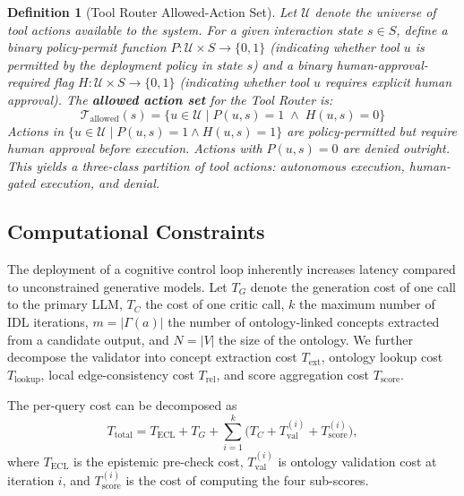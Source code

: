 \documentclass[11pt,a4paper]{article}
\newtheorem{definition}{Definition}
\begin{document}
\begin{definition}[Tool Router Allowed-Action Set]
\label{def:tool_router}
Let $\mathcal{U}$ denote the universe of tool actions available to the system. For a given interaction state $s \in S$, define a binary policy-permit function $P: \mathcal{U} \times S \to \{0,1\}$ (indicating whether tool $u$ is permitted by the deployment policy in state $s$) and a binary human-approval-required flag $H: \mathcal{U} \times S \to \{0,1\}$ (indicating whether tool $u$ requires explicit human approval). The \textbf{allowed action set} for the Tool Router is:
\begin{equation}
  \mathcal{T}_{\text{allowed}}(s) = \{u \in \mathcal{U} \mid P(u,s) = 1 \;\wedge\; H(u,s) = 0\}
  \label{eq:tool_router}
\end{equation}
Actions in $\{u \in \mathcal{U} \mid P(u,s) = 1 \wedge H(u,s) = 1\}$ are policy-permitted but require human approval before execution. Actions with $P(u,s) = 0$ are denied outright. This yields a three-class partition of tool actions: autonomous execution, human-gated execution, and denial.
\end{definition}

\subsection{Computational Constraints}

The deployment of a cognitive control loop inherently increases latency compared to unconstrained generative models. Let $T_G$ denote the generation cost of one call to the primary LLM, $T_C$ the cost of one critic call, $k$ the maximum number of IDL iterations, $m=|\Gamma(a)|$ the number of ontology-linked concepts extracted from a candidate output, and $N=|V|$ the size of the ontology. We further decompose the validator into concept extraction cost $T_{\mathrm{ext}}$, ontology lookup cost $T_{\mathrm{lookup}}$, local edge-consistency cost $T_{\mathrm{rel}}$, and score aggregation cost $T_{\mathrm{score}}$.

The per-query cost can be decomposed as
\begin{equation}
  T_{\text{total}} = T_{\text{ECL}} + T_G + \sum_{i=1}^{k}\bigl(T_C + T_{\text{val}}^{(i)} + T_{\text{score}}^{(i)}\bigr),
  \label{eq:complexity_decomp}
\end{equation}
where $T_{\text{ECL}}$ is the epistemic pre-check cost, $T_{\text{val}}^{(i)}$ is ontology validation cost at iteration $i$, and $T_{\text{score}}^{(i)}$ is the cost of computing the four sub-scores.
\end{document}
